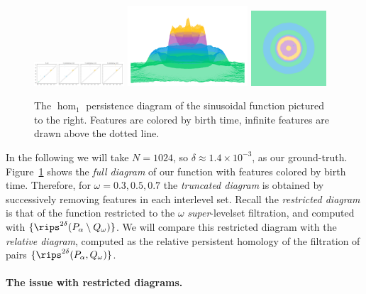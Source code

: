 \begin{figure}[htbp]
  \centering
  \includegraphics[trim=0 0 790 0, clip, width=0.3\textwidth]{scripts/figures/matching2/full-dgm.png}
  \includegraphics[trim=-350 -800 -700 -300, clip, width=0.4\textwidth]{scripts/figures/matching2/full-surf_side-lowres.png}
  \includegraphics[trim=0 -800 0 0, width=0.25\textwidth]{scripts/figures/matching2/full-surf_top-lowres.png}
  \caption{The $\hom_1$ persistence diagram of the sinusoidal function pictured to the right.
  Features are colored by birth time, infinite features are drawn above the dotted line.}\label{fig:ripple1}
\end{figure}

In the following we will take $N = 1024$, so $\delta\approx 1.4\times 10^{-3}$, as our ground-truth.
Figure~\ref{fig:ripple1} shows the \emph{full diagram} of our function with features colored by birth time.
Therefore, for $\omega = 0.3, 0.5, 0.7$ the \emph{truncated diagram} is obtained by successively removing features in each interlevel set.
Recall the \emph{restricted diagram} is that of the function restricted to the $\omega$ \emph{super}-levelset filtration, and computed with $\{\rips^{2\delta}(P_\alpha\setminus Q_\omega)\}$.
We will compare this restricted diagram with the \emph{relative diagram}, computed as the relative persistent homology of the filtration of pairs $\{\rips^{2\delta}(P_\alpha, Q_\omega)\}$.

\paragraph*{The issue with restricted diagrams.}

